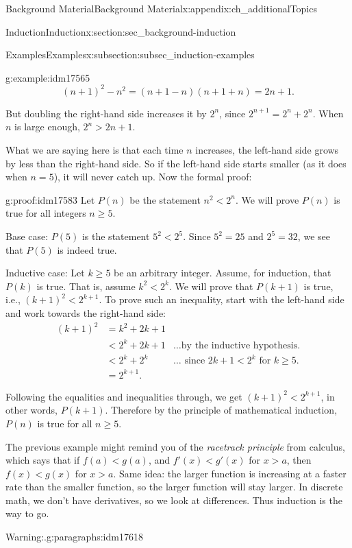 \documentclass[oneside,10pt,]{book}
\numberwithin{equation}{chapter}
\newcommand{\lt}{<}
\newcommand{\amp}{&}
\begin{document}
\begin{appendixptx}{Background Material}{}{Background Material}{}{}{x:appendix:ch_additionalTopics}
\begin{sectionptx}{Induction}{}{Induction}{}{}{x:section:sec_background-induction}
\begin{subsectionptx}{Examples}{}{Examples}{}{}{x:subsection:subsec_induction-examples}
\begin{example}{}{g:example:idm17565}
\begin{equation*}
(n+1)^2 - n^2 = (n+1-n)(n+1+n) = 2n+1.
\end{equation*}
%
\par
But doubling the right-hand side increases it by \(2^n\), since \(2^{n+1} = 2^n + 2^n\). When \(n\) is large enough, \(2^n > 2n + 1\).%
\par
What we are saying here is that each time \(n\) increases, the left-hand side grows by less than the right-hand side. So if the left-hand side starts smaller (as it does when \(n = 5\)), it will never catch up. Now the formal proof:%
\begin{proofptx}{}{g:proof:idm17583}
Let \(P(n)\) be the statement \(n^2 \lt  2^n\). We will prove \(P(n)\) is true for all integers \(n \ge 5\).%
\par
Base case: \(P(5)\) is the statement \(5^2 \lt  2^5\). Since \(5^2 = 25\) and \(2^5 = 32\), we see that \(P(5)\) is indeed true.%
\par
Inductive case: Let \(k \ge 5\) be an arbitrary integer. Assume, for induction, that \(P(k)\) is true. That is, assume \(k^2 \lt  2^k\). We will prove that \(P(k+1)\) is true, i.e., \((k+1)^2 \lt  2^{k+1}\). To prove such an inequality, start with the left-hand side and work towards the right-hand side:%
\begin{align*}
(k+1)^2 \amp = k^2 + 2k + 1 \amp\\
\amp \lt 2^k + 2k + 1 \amp \ldots\text{by the inductive hypothesis.}\\
\amp \lt 2^k + 2^k \amp \ldots\text{ since } 2k + 1 \lt  2^k \text{ for }k \ge 5.\\
\amp = 2^{k+1}. \amp
\end{align*}
%
\par
Following the equalities and inequalities through, we get \((k+1)^2 \lt  2^{k+1}\), in other words, \(P(k+1)\). Therefore by the principle of mathematical induction, \(P(n)\) is true for all \(n \ge 5\).%
\end{proofptx}
\end{example}
The previous example might remind you of the \emph{racetrack principle} from calculus, which says that if \(f(a) \lt  g(a)\), and \(f'(x) \lt  g'(x)\) for \(x > a\), then \(f(x) \lt  g(x)\) for \(x > a\). Same idea: the larger function is increasing at a faster rate than the smaller function, so the larger function will stay larger. In discrete math, we don't have derivatives, so we look at differences. Thus induction is the way to go.%
\begin{paragraphs}{Warning:.}{g:paragraphs:idm17618}%

\end{paragraphs}
\end{subsectionptx}
\end{sectionptx}
\end{appendixptx}
\end{document}
